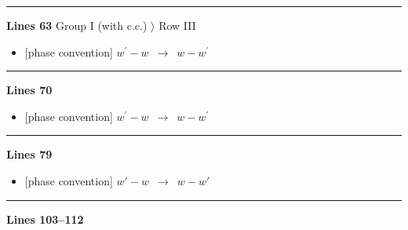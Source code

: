 \documentclass[10pt]{article}
\begin{document}
\noindent\rule{\linewidth}{0.3pt}\par\noindent\textbf{Lines 63} \quad \textsf{Group I (with c.c.) $\rangle$ Row III} \par
\begin{itemize}[leftmargin=2.2em,itemsep=1pt,topsep=2pt]
\item[\textbf{l.63}] \textsf{\small [phase convention]} $\displaystyle w^\prime-w$\ $\longrightarrow$\ $\displaystyle w-w^\prime$
\end{itemize}
\noindent\rule{\linewidth}{0.3pt}\par\noindent\textbf{Lines 70} \par
\begin{itemize}[leftmargin=2.2em,itemsep=1pt,topsep=2pt]
\item[\textbf{l.70}] \textsf{\small [phase convention]} $\displaystyle w^\prime-w$\ $\longrightarrow$\ $\displaystyle w-w^\prime$
\end{itemize}
\noindent\rule{\linewidth}{0.3pt}\par\noindent\textbf{Lines 79} \par
\begin{itemize}[leftmargin=2.2em,itemsep=1pt,topsep=2pt]
\item[\textbf{l.79}] \textsf{\small [phase convention]} $\displaystyle w'-w$\ $\longrightarrow$\ $\displaystyle w-w'$
\end{itemize}
\noindent\rule{\linewidth}{0.3pt}\par\noindent\textbf{Lines 103--112} \par
\end{document}
